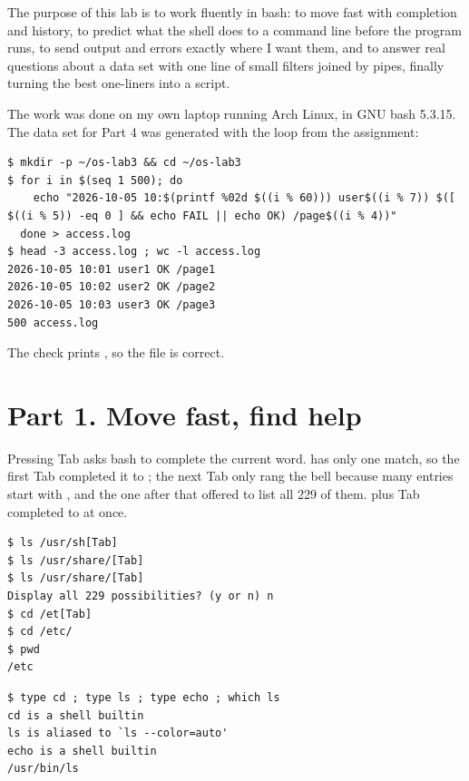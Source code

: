 \documentclass[11pt,a4paper]{article}
\begin{document}
\utmtitlepage
\tableofcontents
\newpage


The purpose of this lab is to work fluently in bash: to move fast with completion and history,
to predict what the shell does to a command line before the program runs, to send output and
errors exactly where I want them, and to answer real questions about a data set with one line
of small filters joined by pipes, finally turning the best one-liners into a script.

The work was done on my own laptop running Arch Linux, in GNU bash 5.3.15. The data set for
Part 4 was generated with the loop from the assignment:

\begin{lstlisting}
$ mkdir -p ~/os-lab3 && cd ~/os-lab3
$ for i in $(seq 1 500); do
    echo "2026-10-05 10:$(printf %02d $((i % 60))) user$((i % 7)) $([ $((i % 5)) -eq 0 ] && echo FAIL || echo OK) /page$((i % 4))"
  done > access.log
$ head -3 access.log ; wc -l access.log
2026-10-05 10:01 user1 OK /page1
2026-10-05 10:02 user2 OK /page2
2026-10-05 10:03 user3 OK /page3
500 access.log
\end{lstlisting}

The check prints , so the file is correct.

\section{Part 1. Move fast, find help}

Pressing Tab asks bash to complete the current word.  has only one match, so the
first Tab completed it to ; the next Tab only rang the bell because many
entries start with , and the one after that offered to list all 229 of them.
 plus Tab completed to  at once.

\begin{lstlisting}[caption={Tab completion}]
$ ls /usr/sh[Tab]
$ ls /usr/share/[Tab]
$ ls /usr/share/[Tab]
Display all 229 possibilities? (y or n) n
$ cd /et[Tab]
$ cd /etc/
$ pwd
/etc
\end{lstlisting}

\begin{lstlisting}[caption={Output of type and which}]
$ type cd ; type ls ; type echo ; which ls
cd is a shell builtin
ls is aliased to `ls --color=auto'
echo is a shell builtin
/usr/bin/ls
\end{lstlisting}
\end{document}
